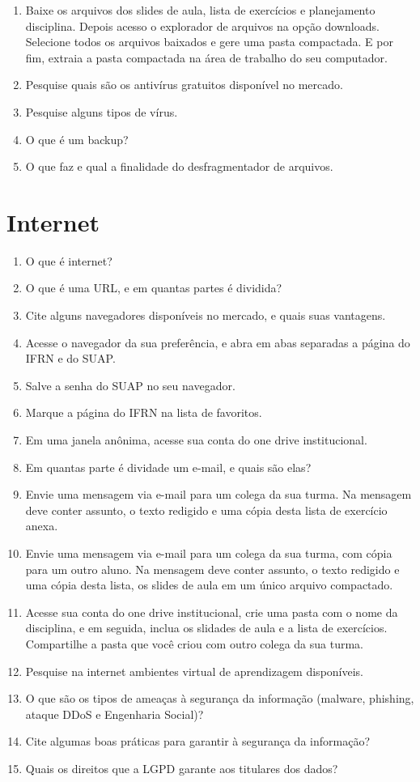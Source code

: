\documentclass[11pt]{article}
\begin{document}
\begin{enumerate}
		\item Baixe os arquivos dos slides de aula, lista de exercícios e planejamento disciplina. Depois acesso o explorador de arquivos na opção downloads. Selecione todos os arquivos baixados e gere uma pasta compactada. E por fim, extraia a pasta compactada na área de trabalho do seu computador.
		\item Pesquise quais são os antivírus gratuitos disponível no mercado.
		\item Pesquise alguns tipos de vírus.
		\item O que é um backup?
		\item O que faz e qual a finalidade do desfragmentador de arquivos. 
	\end{enumerate}
	
	\section{Internet}
	
	\begin{enumerate}
		\item O que é internet?
		\item O que é uma URL, e em quantas partes é dividida?
		\item Cite alguns navegadores disponíveis no mercado, e quais suas vantagens.
		\item Acesse o navegador da sua preferência, e abra em abas separadas a página do IFRN e do SUAP.
		\item Salve a senha do SUAP no seu navegador.
		\item Marque a página do IFRN na lista de favoritos.
		\item Em uma janela anônima, acesse sua conta do one drive institucional.
		\item Em quantas parte é dividade um e-mail, e quais são elas?
		\item Envie uma mensagem via e-mail para um colega da sua turma. Na mensagem deve conter assunto, o texto redigido e uma cópia desta lista de exercício anexa.
		\item Envie uma mensagem via e-mail para um colega da sua turma, com cópia para um outro aluno. Na mensagem deve conter assunto, o texto redigido e uma cópia desta lista, os slides de aula em um único arquivo compactado.
		\item Acesse sua conta do one drive institucional, crie uma pasta com o nome da disciplina, e em seguida, inclua os slidades de aula e a lista de exercícios. Compartilhe a pasta que você criou com outro colega da sua turma.
		\item Pesquise na internet ambientes virtual de aprendizagem disponíveis.
		\item O que são os tipos de ameaças à segurança da informação (malware, phishing, ataque DDoS e Engenharia Social)?
		\item Cite algumas boas práticas para garantir à segurança da informação?
		\item Quais os direitos que a LGPD garante aos titulares dos dados?
	\end{enumerate}
	
\end{document}
